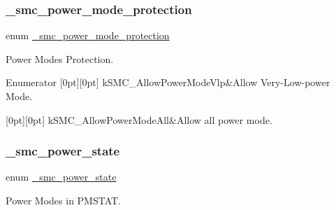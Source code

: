 \subsubsection{\texorpdfstring{\_smc\_power\_mode\_protection}{\_smc\_power\_mode\_protection}}
{\footnotesize\ttfamily enum \mbox{\hyperlink{group__smc_ga53fe305f7c8245eb9faac439fc4d5051}{\+\_\+smc\+\_\+power\+\_\+mode\+\_\+protection}}}



Power Modes Protection. 

\begin{DoxyEnumFields}{Enumerator}
[0pt][0pt]{}\mbox{\label{group__smc_gga53fe305f7c8245eb9faac439fc4d5051a59c7889c43c88969558086058a70025c}} 
k\+S\+M\+C\+\_\+\+Allow\+Power\+Mode\+Vlp&Allow Very-\/\+Low-\/power Mode. \\
\hline

[0pt][0pt]{}\mbox{\label{group__smc_gga53fe305f7c8245eb9faac439fc4d5051a2d2790f7f2a43e4fc6f3816cc1693328}} 
k\+S\+M\+C\+\_\+\+Allow\+Power\+Mode\+All&Allow all power mode. \\
\hline

\end{DoxyEnumFields}
\mbox{\label{group__smc_gac5330d1b90932ef578e4e0d06b2f5ae5}} 
\subsubsection{\texorpdfstring{\_smc\_power\_state}{\_smc\_power\_state}}
{\footnotesize\ttfamily enum \mbox{\hyperlink{group__smc_gac5330d1b90932ef578e4e0d06b2f5ae5}{\+\_\+smc\+\_\+power\+\_\+state}}}



Power Modes in P\+M\+S\+T\+AT. 

